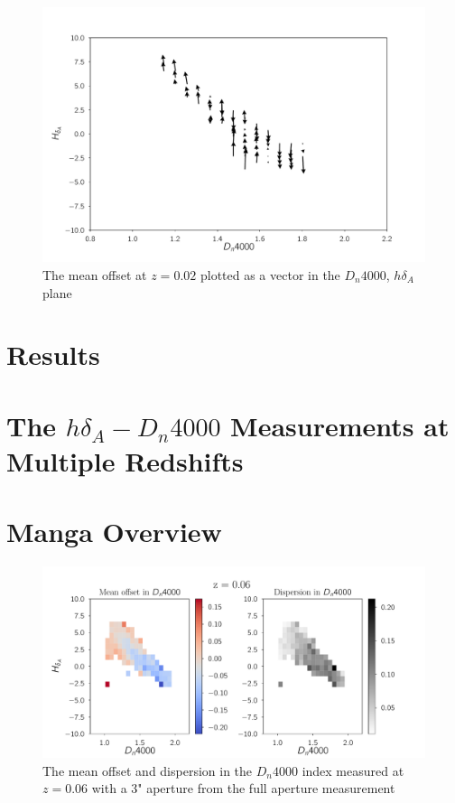 \begin{figure}
\includegraphics[width=\textwidth]{figures/zd.pdf}
\caption[Short figure name.]{ The mean offset at $z=0.02$ plotted as a vector in the $D_{n}4000$, $h\delta_{A}$ plane
\label{fig:myInlineFigure}}
\end{figure}

\section{Results}

\section{The $h\delta_{A}-D_{n}4000$ Measurements at Multiple Redshifts}
\section{Manga Overview}
\begin{figure}
\includegraphics[width=\textwidth]{figures/z6b.pdf}
\caption[Short figure name.]{ The mean offset and dispersion in the $D_{n}4000$ index measured at $z = 0.06$ with a $3$" aperture from the full aperture measurement
\label{fig:myInlineFigure}}
\end{figure}

